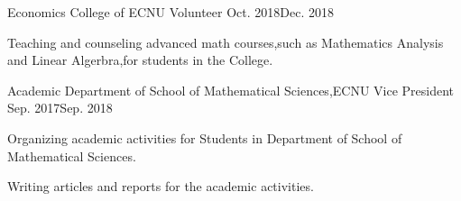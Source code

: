 
\begin{projitem}
    {Economics College of ECNU}
    {Volunteer}
    {Oct. 2018}{Dec. 2018}
    \item Teaching and counseling advanced math courses,such as Mathematics Analysis and Linear Algerbra,for students in the College.
\end{projitem}

\begin{projitem}
    {Academic Department of School of Mathematical Sciences,ECNU}
    {Vice President}
    {Sep. 2017}{Sep. 2018}
    \item Organizing academic activities for Students in Department of School of Mathematical Sciences.
    \item Writing articles and reports for the academic activities.
\end{projitem}

\endinput